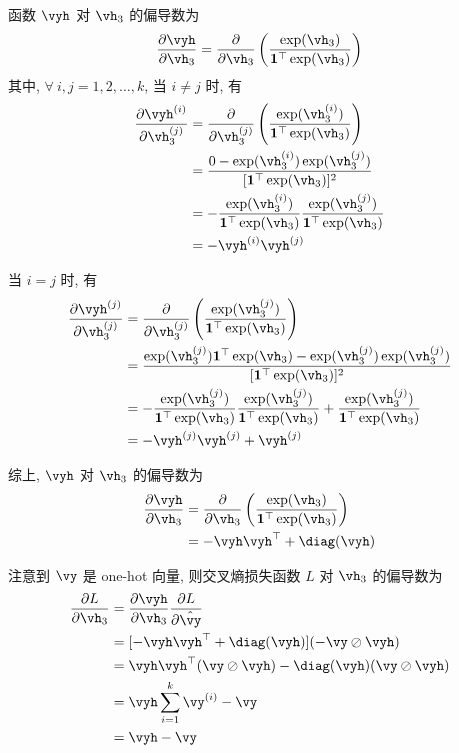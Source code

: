 \documentclass[openany]{ctexbook}
\theoremstyle{kaiti}
\theoremstyle{normal}
\begin{document}
函数 $\vyh$ 对 $\vh_3$ 的偏导数为
\begin{equation}
  \frac{\partial \vyh}{\partial\vh_3}
  =\frac{\partial}{\partial\vh_3}\left(\frac{\exp(\vh_3)}{\bm{1}^\top\exp(\vh_3)}\right)
\end{equation}
其中, $\forall~i,j=1,2,\dots,k$, 当 $i\neq j$ 时, 有
\begin{equation}
  \begin{aligned}
    \frac{\partial \vyh^{(i)}}{\partial\vh_3^{(j)}}
    &=\frac{\partial}{\partial\vh_3^{(j)}}\left(\frac{\exp(\vh_3^{(i)})}{\bm{1}^\top\exp(\vh_3)}\right)\\
    &=\frac{0-\exp(\vh_3^{(i)})\exp(\vh_3^{(j)})}{[\bm{1}^\top\exp(\vh_3)]^2}\\
    &=-\frac{\exp(\vh_3^{(i)})}{\bm{1}^\top\exp(\vh_3)}\frac{\exp(\vh_3^{(j)})}{\bm{1}^\top\exp(\vh_3)}\\
    &=-\vyh^{(i)}\vyh^{(j)}
  \end{aligned}
\end{equation}

当 $i=j$ 时, 有
\begin{equation}
  \begin{aligned}
    \frac{\partial \vyh^{(j)}}{\partial\vh_3^{(j)}}
    &=\frac{\partial}{\partial\vh_3^{(j)}}\left(\frac{\exp(\vh_3^{(j)})}{\bm{1}^\top\exp(\vh_3)}\right)\\
    &=\frac{\exp(\vh_3^{(j)})\bm{1}^\top\exp(\vh_3)-\exp(\vh_3^{(j)})\exp(\vh_3^{(j)})}{[\bm{1}^\top\exp(\vh_3)]^2}\\
    &=-\frac{\exp(\vh_3^{(j)})}{\bm{1}^\top\exp(\vh_3)}\frac{\exp(\vh_3^{(j)})}{\bm{1}^\top\exp(\vh_3)}+\frac{\exp(\vh_3^{(j)})}{\bm{1}^\top\exp(\vh_3)}\\
    &=-\vyh^{(j)}\vyh^{(j)}+\vyh^{(j)}
  \end{aligned}
\end{equation}

综上, $\vyh$ 对 $\vh_3$ 的偏导数为
\begin{equation}
  \begin{aligned}
    \frac{\partial \vyh}{\partial\vh_3}
    &=\frac{\partial}{\partial\vh_3}\left(\frac{\exp(\vh_3)}{\bm{1}^\top\exp(\vh_3)}\right)\\
    &=-\vyh\vyh^\top+\diag(\vyh)\\
  \end{aligned}
\end{equation}

注意到 $\vy$ 是 one-hot 向量, 则交叉熵损失函数 $L$ 对 $\vh_3$ 的偏导数为
\begin{equation}
  \begin{aligned}
    \frac{\partial L}{\partial \vh_3}
    &=\frac{\partial \vyh}{\partial\vh_3}\frac{\partial L}{\partial \hat{\vy}}\\
    &=[-\vyh\vyh^\top+\diag(\vyh)](-\vy\oslash\vyh)\\
    &=\vyh\vyh^\top(\vy\oslash\vyh)-\diag(\vyh)(\vy\oslash\vyh)\\
    &=\vyh\sum_{i=1}^k\vy^{(i)}-\vy\\
    &=\vyh-\vy\\
  \end{aligned}
\end{equation}
\end{document}

